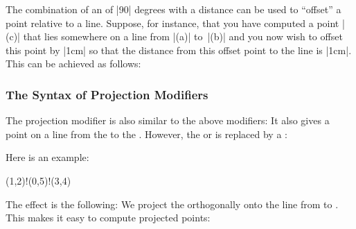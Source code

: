 The combination of an  of |90| degrees with a distance can be used
to ``offset'' a point relative to a line. Suppose, for instance, that you have
computed a point |(c)| that lies somewhere on a line from |(a)| to~|(b)| and
you now wish to offset this point by |1cm| so that the distance from this
offset point to the line is |1cm|. This can be achieved as follows:
%
\begin{codeexample}[]
\end{codeexample}


\subsubsection{The Syntax of Projection Modifiers}

The projection modifier is also similar to the above modifiers: It also gives a
point on a line from the  to the .
However, the  or  is replaced by a
:
%
\begin{quote}
\end{quote}

Here is an example:
%
\begin{codeexample}
(1,2)!(0,5)!(3,4)
\end{codeexample}

The effect is the following: We project the 
orthogonally onto the line from  to .
This makes it easy to compute projected points:
%
\begin{codeexample}[]
\end{codeexample}
